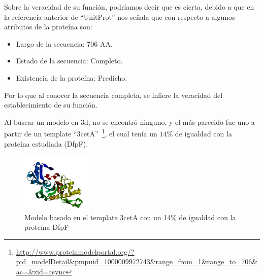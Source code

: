 Sobre la veracidad de su función, podríamos decir que es cierta,
debido a que en la referencia anterior de ``UnitProt'' nos señala
que con respecto a algunos atributos de la proteína son:
\begin{itemize}
	\item Largo de la secuencia: 706 AA.
	\item Estado de la secuencia: Completo.
	\item Existencia de la proteína: Predicho.
\end{itemize}

Por lo que al conocer la secuencia completa, se infiere la veracidad
del establecimiento de su función.

Al buscar un modelo en 3d, no se encontró ninguno,
y el más parecido fue uno a partir de un template ``3cetA''~\footnote{\url{http://www.proteinmodelportal.org/?pid=modelDetail&pmpuid=1000009972743&range_from=1&range_to=706&ac=&zid=async}},
el cual tenía un $14\%$ de igualdad con la proteína estudiada (DfpF).

        \begin{figure}[!h]
            \begin{center}
                \includegraphics[width=0.3\textwidth]{img/parecida}
            \end{center}
            \caption{Modelo basado en el template 3cetA con un 14\% de igualdad con la proteína DfpF}
        \end{figure}

